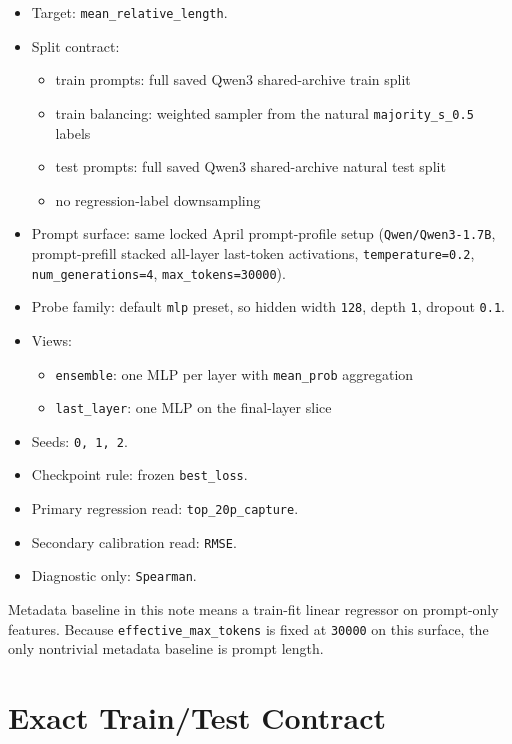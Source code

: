 \documentclass[11pt]{article}
\begin{document}
\begin{itemize}
\item Target: \texttt{mean\_relative\_length}.
\item Split contract:
  \begin{itemize}
  \item train prompts: full saved Qwen3 shared-archive train split
  \item train balancing: weighted sampler from the natural \texttt{majority\_s\_0.5} labels
  \item test prompts: full saved Qwen3 shared-archive natural test split
  \item no regression-label downsampling
  \end{itemize}
\item Prompt surface: same locked April prompt-profile setup (\texttt{Qwen/Qwen3-1.7B}, prompt-prefill stacked all-layer last-token activations, \texttt{temperature=0.2}, \texttt{num\_generations=4}, \texttt{max\_tokens=30000}).
\item Probe family: default \texttt{mlp} preset, so hidden width \texttt{128}, depth \texttt{1}, dropout \texttt{0.1}.
\item Views:
  \begin{itemize}
  \item \texttt{ensemble}: one MLP per layer with \texttt{mean\_prob} aggregation
  \item \texttt{last\_layer}: one MLP on the final-layer slice
  \end{itemize}
\item Seeds: \texttt{0, 1, 2}.
\item Checkpoint rule: frozen \texttt{best\_loss}.
\item Primary regression read: \texttt{top\_20p\_capture}.
\item Secondary calibration read: \texttt{RMSE}.
\item Diagnostic only: \texttt{Spearman}.
\end{itemize}

Metadata baseline in this note means a train-fit linear regressor on prompt-only
features. Because \texttt{effective\_max\_tokens} is fixed at \texttt{30000} on
this surface, the only nontrivial metadata baseline is prompt length.

\section{Exact Train/Test Contract}
\end{document}
